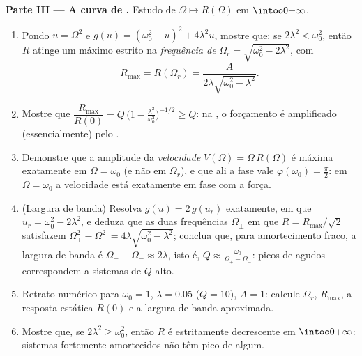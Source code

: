 \begin{problem}
\medskip
\noindent\textbf{Parte III --- A curva de .} Estudo de
$\Omega \mapsto R(\Omega)$ em $\intoo0{+\infty}$.
\begin{enumerate}
  \item Pondo $u = \Omega^2$ e $g(u) = (\omega_0^2 - u)^2 +
        4\lambda^2 u$, mostre que: se $2\lambda^2 < \omega_0^2$, então $R$
        atinge um máximo estrito na \emph{frequência de }
        $\Omega_r = \sqrt{\omega_0^2 - 2\lambda^2}$, com
        \[
        R_{\max} = R(\Omega_r)
        = \frac{A}{2\lambda\sqrt{\omega_0^2 - \lambda^2}} .
        \]
  \item Mostre que $\dfrac{R_{\max}}{R(0)} = Q\,\bigl(1 -
        \tfrac{\lambda^2}{\omega_0^2}\bigr)^{-1/2} \geq Q$: na
        , o forçamento é amplificado (essencialmente) pelo
        .
  \item Demonstre que a amplitude da \emph{velocidade} $V(\Omega) =
        \Omega\,R(\Omega)$ é máxima exatamente em $\Omega =
        \omega_0$ (e não em $\Omega_r$), e que ali a fase vale
        $\varphi(\omega_0) = \frac\pi2$: em $\Omega = \omega_0$
        a velocidade está exatamente em fase com a força.
  \item (Largura de banda) Resolva $g(u) = 2\,g(u_r)$ exatamente, em que $u_r =
        \omega_0^2 - 2\lambda^2$, e deduza que as duas
        frequências $\Omega_\pm$ em que $R = R_{\max}/\sqrt2$
        satisfazem $\Omega_+^2 - \Omega_-^2 =
        4\lambda\sqrt{\omega_0^2 - \lambda^2}$; conclua que, para
        amortecimento fraco, a largura de banda é $\Omega_+ - \Omega_-
        \approx 2\lambda$, isto é, $Q \approx
        \frac{\omega_0}{\Omega_+ - \Omega_-}$: picos de 
        agudos correspondem a sistemas de $Q$ alto.
  \item Retrato numérico para $\omega_0 = 1$, $\lambda = 0.05$
        ($Q = 10$), $A = 1$: calcule $\Omega_r$, $R_{\max}$, a
        resposta estática $R(0)$ e a largura de banda aproximada.
  \item Mostre que, se $2\lambda^2 \geq \omega_0^2$, então $R$ é
        estritamente decrescente em $\intoo0{+\infty}$: sistemas fortemente
        amortecidos não têm pico de  algum.
\end{enumerate}


\end{problem}
